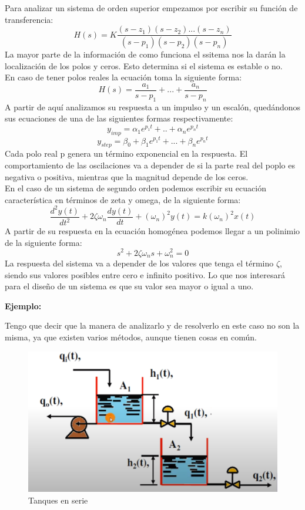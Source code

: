 Para analizar un sistema de orden superior empezamos por escribir su función de transferencia:
\begin{equation}
	H(s)=K\frac{(s-z_1)(s-z_2)...(s-z_n)}{(s-p_1)(s-p_2)(s-p_n)}
\end{equation} 
La mayor parte de la información de como funciona el ssitema nos la darán la localización de los polos y ceros. Esto determina si el sistema es estable o no.\\
En caso de tener polos reales la ecuación toma la siguiente forma:
\begin{equation}
	H(s)=\frac{a_1}{s-p_1}+...+\frac{a_n}{s-p_n}
\end{equation}
A partir de aquí analizamos su respuesta a un impulso y un escalón, quedándonos sus ecuaciones de una de las siguientes formas respectivamente:
\begin{equation}
	y_{imp}=\alpha_1 e^{p_1t}+..+\alpha_n e^{p_nt}
\end{equation}
\begin{equation}
	y_{step}=\beta_0 + \beta_1 e^{p_1t}+...+ \beta_n e^{p_nt}
\end{equation}
Cada polo real p genera un término exponencial en la respuesta. El comportamiento de las oscilaciones va a depender de si la parte real del poplo es negativa o positiva, mientras que la magnitud depende de los ceros.\\
En el caso de un sistema de segundo orden podemos escribir su ecuación característica en términos de zeta y omega, de la siguiente forma:
\begin{equation}
	\frac{d^2y(t)}{dt^2}+2\zeta \omega_n \frac{dy(t)}{dt}+(\omega_n)^2y(t)=k(\omega_n)^2x(t)
\end{equation}
A partir de su respuesta en la ecuación homogénea podemos llegar a un polinimio de la siguiente forma:
\begin{equation}
	s^2+2\zeta\omega_ns+\omega^2_n=0
\end{equation}
La respuesta del sistema va a depender de los valores que tenga el término $\zeta$, siendo sus valores posibles entre cero e infinito positivo. Lo que nos interesará para el diseño de un sistema es que su valor sea mayor o igual a uno.



\textbf{Ejemplo:}

Tengo que decir que la manera de analizarlo y de resolverlo en este caso no son la misma, ya que existen varios métodos, aunque tienen cosas en común.

\begin{figure}[H]
	\centering
	\includegraphics[width=0.7\linewidth]{img/s3}
	\caption{Tanques en serie}
	\label{fig:s3}
\end{figure}


